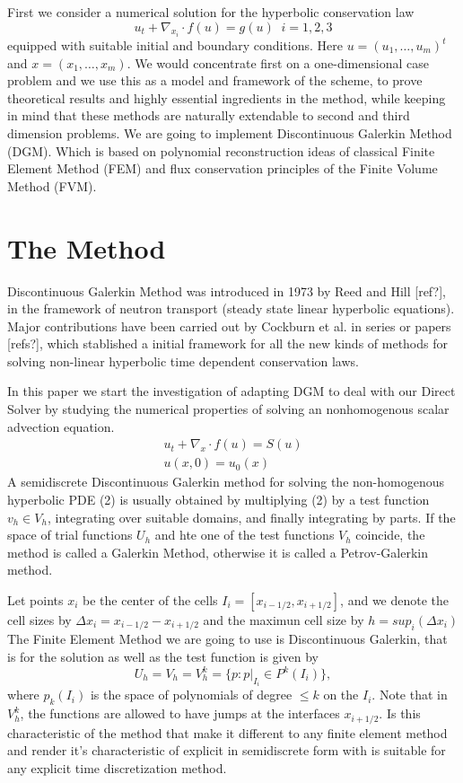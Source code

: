 \documentclass[11pt,fleqn]{report}
\begin{document}
First we consider a numerical solution for the hyperbolic conservation law
\begin{equation}
 u_t + \nabla_{x_i} \cdot f(u) = g(u) \;\; i = 1,2,3
\end{equation}
equipped with suitable initial and boundary conditions. Here
$ u = (u_1, \dots , u_m)^t$ and $x = (x_1, \dots , x_m)$. 
We would concentrate first on a one-dimensional case problem and we use this as a model and framework of the scheme, to prove theoretical results and highly essential ingredients in the method, while keeping in mind that these methods are naturally extendable to second and third dimension problems.
We are going to implement Discontinuous Galerkin Method (DGM). Which is based on polynomial reconstruction ideas of classical Finite Element Method (FEM) and flux conservation principles of the Finite Volume Method (FVM).

\section{The Method}
Discontinuous Galerkin Method was introduced in 1973 by Reed and Hill [ref?], in the framework of neutron transport (steady state linear hyperbolic equations). Major contributions have been carried out by Cockburn et al. in series or papers [refs?], which stablished a initial framework for all the new kinds of methods for solving non-linear hyperbolic time dependent conservation laws.

In this paper we start the investigation of adapting DGM to deal with our Direct Solver by studying the numerical properties of solving an nonhomogenous scalar advection equation.  
\begin{eqnarray}
 u_t + \nabla_x \cdot f(u) = S(u) \\
 u(x,0) = u_0(x) \nonumber
\end{eqnarray}
A semidiscrete Discontinuous Galerkin method for solving the non-homogenous hyperbolic PDE (2) is usually obtained by multiplying (2) by a test function $v_h \in V_h$, integrating over suitable domains, and finally integrating by parts. If the space of trial functions $U_h$ and hte one of the test functions $V_h$ coincide, the method is called a Galerkin Method, otherwise it is called a Petrov-Galerkin method.

Let points $x_i$ be the center of the cells $I_i = [x_{i-1/2},x_{i+1/2}]$, and we denote the cell sizes by $\Delta x_i = x_{i-1/2}-x_{i+1/2}$ and the maximun cell size by $h =  sup_i(\Delta x_i)$ The Finite Element Method we are going to use is Discontinuous Galerkin, that is for the solution as well as the test function is given by
\begin{equation}
 U_h = V_h = V_h^k = \{p : p|_{I_i} \in P^k(I_i)\},
\end{equation}
where $p_k(I_i)$ is the space of polynomials of degree $\leq k$ on the $I_i$. Note that in $V_h^k$, the functions are allowed to have jumps at the interfaces $x_{i+1/2}$. Is this characteristic of the method that make it different to any finite element method and render it's characteristic of explicit in semidiscrete form with is suitable for any explicit time discretization method.
\end{document}
